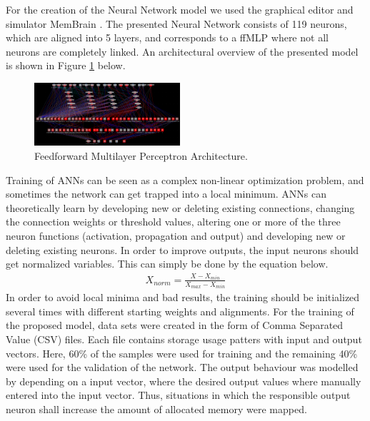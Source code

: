 For the creation of the Neural Network model we used the graphical editor and simulator MemBrain \cite{MemBrain}. The presented Neural Network consists of 119 neurons, which are aligned into 5 layers, and corresponds to a ffMLP where not all neurons are completely linked. An architectural overview of the presented model is shown in Figure \ref{fig:Netz2} below.


\begin{figure}[ht]
	\begin{center}
		\includegraphics[width=0.48\textwidth]{fig/netz2.png}
	\end{center}
	\caption{Feedforward Multilayer Perceptron Architecture.}
	\label{fig:Netz2}
\end{figure}

Training of ANNs can be seen as a complex non-linear optimization problem, and sometimes the network can  get trapped into a local minimum. ANNs can theoretically learn by developing new or deleting existing connections, changing the connection weights or threshold values, altering one or more of the three neuron functions (activation, propagation and output) and developing new or deleting existing neurons. In order to improve outputs, the input neurons should get normalized variables. This can simply be done by the equation below.
\begin{eqnarray}
X_{norm}  = \frac{X - X_{min}}{X_{max} - X_{min} }
\end{eqnarray}
In order to avoid local minima and bad results, the training should be initialized several times with different  starting weights and alignments. For the training of the proposed model, data sets were created in the form of Comma Separated Value (CSV) files. Each file contains storage usage patters with input and output vectors. Here, 60\% of the samples were used for training and the remaining 40\% were used for the validation of the network. The output behaviour was modelled by depending on a input vector, where the desired output values where manually entered into the input vector. Thus, situations in which the responsible output neuron shall increase the amount of allocated memory were mapped.

